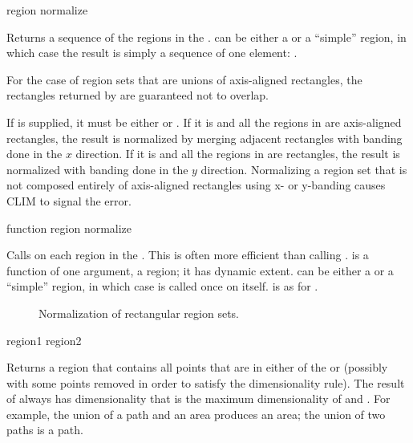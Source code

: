  {region \key normalize}

Returns a sequence of the regions in the  .
 can be either a  or a ``simple'' region, in which
case the result is simply a sequence of one element: .
\ReadOnly

For the case of region sets that are unions of axis-aligned rectangles, the
rectangles returned by  are guaranteed not to overlap.

If  is supplied, it must be either  or
.  If it is  and all the regions in 
are axis-aligned rectangles, the result is normalized by merging adjacent
rectangles with banding done in the $x$ direction.  If it is  and
all the regions in  are rectangles, the result is normalized with
banding done in the $y$ direction.  Normalizing a region set that is not
composed entirely of axis-aligned rectangles using x- or y-banding causes CLIM
to signal the  error.

 {function region \key normalize}

Calls  on each region in the  .  This
is often more efficient than calling .   is
a function of one argument, a region; it has dynamic extent.   can
be either a  or a ``simple'' region, in which case
 is called once on  itself.   is as for
.


\begin{figure}
\ifpsfig\centerline{}\else\vspace{3.25in}\fi
\caption{Normalization of rectangular region sets.}
\end{figure}


 {region1 region2}

Returns a region that contains all points that are in either of the
  or  (possibly with some points removed
in order to satisfy the dimensionality rule).  The result of 
always has dimensionality that is the maximum dimensionality of 
and .  For example, the union of a path and an area produces an
area; the union of two paths is a path.

